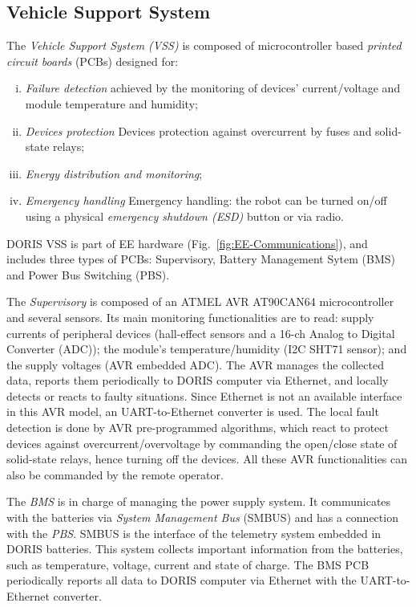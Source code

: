 \documentclass{ifacconf}
\begin{document}
\subsection{Vehicle Support System}\label{sec:VSS} 
The \emph{Vehicle Support System (VSS)} \citep{MARIUS} is composed of
microcontroller based \emph{printed circuit boards} (PCBs) designed for:

\begin{enumerate}[i)]
\item \emph{Failure detection} achieved by the monitoring of devices'
current/voltage and module temperature and humidity;
\item \emph{Devices protection} Devices protection against overcurrent by fuses and
solid-state relays;
\item \emph{Energy distribution and monitoring};
\item \emph{Emergency handling} Emergency handling: the robot can be turned on/off
using a physical \emph{emergency shutdown (ESD)} button
or via radio.
\end{enumerate}

DORIS VSS is part of EE hardware (Fig.~\ref{fig:EE-Communications}), and
includes three types of PCBs: Supervisory, Battery Management Sytem (BMS) and
Power Bus Switching (PBS).

The \emph{Supervisory} is composed of an ATMEL AVR AT90CAN64 microcontroller
and several sensors. Its main monitoring functionalities are to read: supply
currents of peripheral devices (hall-effect sensors and a 16-ch Analog to
Digital Converter (ADC)); the module's temperature/humidity (I2C SHT71 sensor);
and the supply voltages (AVR embedded ADC). The AVR manages the collected data,
reports them periodically to DORIS computer via Ethernet, and locally detects or
reacts to faulty situations. Since Ethernet is not an available interface in
this AVR model, an UART-to-Ethernet converter is used. The local fault
detection is done by AVR pre-programmed algorithms, which react to protect
devices against overcurrent/overvoltage by commanding the open/close state of
solid-state relays, hence turning off the devices. All these AVR
functionalities can also be commanded by the remote operator.

The \emph{BMS} is in charge of managing the power supply system. It
communicates with the batteries via \emph{System Management Bus} (SMBUS) and has
a connection with the \emph{PBS}. SMBUS is the interface of the telemetry
system embedded in DORIS batteries. This system collects important information
from the batteries, such as temperature, voltage, current and state of charge.
The BMS PCB periodically reports all data to DORIS computer via Ethernet with
the UART-to-Ethernet converter.
\end{document}
